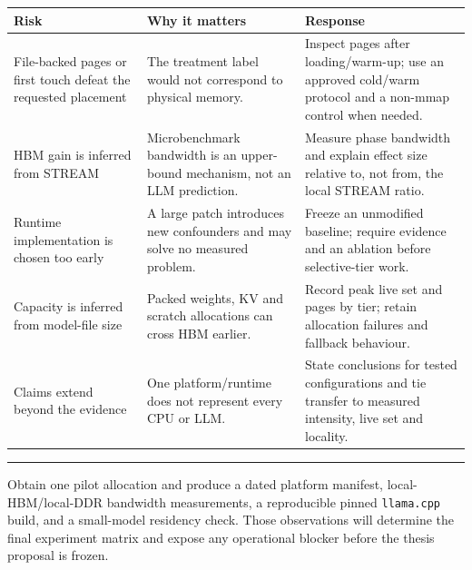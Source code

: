 \documentclass[10pt,a4paper]{article}
\newcommand{\heading}[1]{%
  \vspace{4pt}{\large\bfseries\color{accent}#1}\par
  \vspace{1pt}\hrule height 0.35pt\vspace{4pt}}
\begin{document}
\begin{table}[h]
\centering
\footnotesize
\begin{tabularx}{\textwidth}{@{}P{3.0cm}YY@{}}
\toprule
\textbf{Risk} & \textbf{Why it matters} & \textbf{Response} \\
\midrule
File-backed pages or first touch defeat the requested placement
& The treatment label would not correspond to physical memory.
& Inspect pages after loading/warm-up; use an approved cold/warm
  protocol and a non-mmap control when needed. \\
\addlinespace
HBM gain is inferred from STREAM
& Microbenchmark bandwidth is an upper-bound mechanism, not an LLM
  prediction.
& Measure phase bandwidth and explain effect size relative to, not from,
  the local STREAM ratio. \\
\addlinespace
Runtime implementation is chosen too early
& A large patch introduces new confounders and may solve no measured
  problem.
& Freeze an unmodified baseline; require evidence and an ablation before
  selective-tier work. \\
\addlinespace
Capacity is inferred from model-file size
& Packed weights, KV and scratch allocations can cross HBM earlier.
& Record peak live set and pages by tier; retain allocation failures and
  fallback behaviour. \\
\addlinespace
Claims extend beyond the evidence
& One platform/runtime does not represent every CPU or LLM.
& State conclusions for tested configurations and tie transfer to
  measured intensity, live set and locality. \\
\bottomrule
\end{tabularx}
\end{table}

\heading{Immediate next step}

Obtain one pilot allocation and produce a dated platform manifest,
local-HBM/local-DDR bandwidth measurements, a reproducible pinned
\texttt{llama.cpp} build, and a small-model residency check.  Those
observations will determine the final experiment matrix and expose any
operational blocker before the thesis proposal is frozen.

\vfill
{\footnotesize
\setlength{\bibsep}{1pt}
\renewcommand{\bibsection}{\textbf{\color{accent}Selected references}\par}


}
\end{document}
